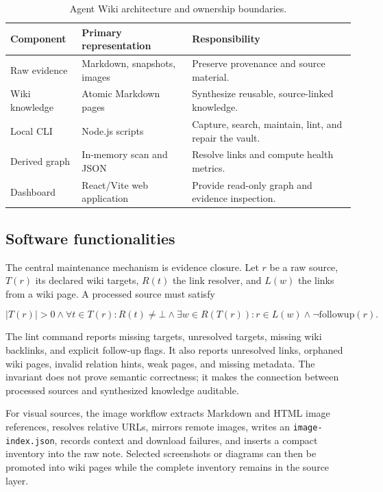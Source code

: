 \documentclass[preprint,12pt,a4paper]{elsarticle}
\begin{document}
\begin{table}[!h]
\small
\centering
\begin{tabular}{p{3.0cm}p{4.6cm}p{6.2cm}}
\toprule
Component & Primary representation & Responsibility \\
\midrule
Raw evidence & Markdown, snapshots, images & Preserve provenance and source material. \\
Wiki knowledge & Atomic Markdown pages & Synthesize reusable, source-linked knowledge. \\
Local CLI & Node.js scripts & Capture, search, maintain, lint, and repair the vault. \\
Derived graph & In-memory scan and JSON & Resolve links and compute health metrics. \\
Dashboard & React/Vite web application & Provide read-only graph and evidence inspection. \\
\bottomrule
\end{tabular}
\caption{Agent Wiki architecture and ownership boundaries.}
\label{tab:architecture}
\end{table}

\subsection{Software functionalities}

The central maintenance mechanism is evidence closure. Let $r$ be a raw source,
$T(r)$ its declared wiki targets, $R(t)$ the link resolver, and $L(w)$ the links
from a wiki page. A processed source must satisfy

\[
|T(r)|>0 \land \forall t\in T(r):R(t)\neq\bot \land
\exists w\in R(T(r)):r\in L(w) \land \neg\mathrm{followup}(r).
\]

The lint command reports missing targets, unresolved targets, missing wiki
backlinks, and explicit follow-up flags. It also reports unresolved links,
orphaned wiki pages, invalid relation hints, weak pages, and missing metadata.
The invariant does not prove semantic correctness; it makes the connection
between processed sources and synthesized knowledge auditable.

For visual sources, the image workflow extracts Markdown and HTML image
references, resolves relative URLs, mirrors remote images, writes an
\texttt{image-index.json}, records context and download failures, and inserts a
compact inventory into the raw note. Selected screenshots or diagrams can then
be promoted into wiki pages while the complete inventory remains in the source
layer.
\end{document}
